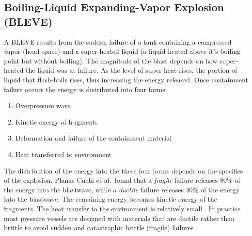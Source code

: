 \documentclass[10pt,parskip=half,
toc=sectionentrywithdots,
bibliography=totocnumbered,
captions=tableheading,numbers=noendperiod]{scrartcl}
\providecommand{\tightlist}{%
  \setlength{\itemsep}{0pt}\setlength{\parskip}{0pt}}
\begin{document}
\hypertarget{boiling-liquid-expanding-vapor-explosion-bleve}{%
\subsection{Boiling-Liquid Expanding-Vapor Explosion
(BLEVE)}\label{boiling-liquid-expanding-vapor-explosion-bleve}}

A BLEVE results from the sudden failure of a tank containing a
compressed vapor (head space) and a super-heated liquid (a liquid heated
above it's boiling point but without boiling). The magnitude of the
blast depends on how super-heated the liquid was at failure. As the
level of super-heat rises, the portion of liquid that flash-boils rises,
thus increasing the energy released. Once containment failure occurs the
energy is distributed into four forms:

\begin{enumerate}
\def\labelenumi{\arabic{enumi}.}
\tightlist
\item
  Overpressure wave
\item
  Kinetic energy of fragments
\item
  Deformation and failure of the containment material
\item
  Heat transferred to environment
\end{enumerate}

The distribution of the energy into the these four forms depends on the
specifics of the explosion. Planas-Cuchi et al.~found that a
\emph{fragile} failure releases 80\% of the energy into the blastwave,
while a \emph{ductile} failure releases 40\% of the energy into the
blastwave. The remaining energy becomes kinetic energy of the fragments.
The heat transfer to the environment is relatively small
\cite{Planas2004}. In practice most pressure vessels are designed with
materials that are ductile rather than brittle to avoid sudden and
catastrophic brittle (fragile) failures \cite{Benac2016}.
\end{document}
